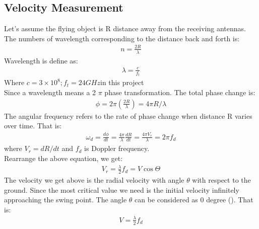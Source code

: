 \subsection{Velocity Measurement}
Let’s assume the flying object is R distance away from the receiving antennas. The numbers of wavelength corresponding to the distance back and forth is:
\begin{align}
n=\frac{2 R}{\lambda}    
\end{align}
Wavelength is define as:
\begin{align}
\lambda=\frac{c}{f_{t}}
\end{align}
Where $c=3 \times 10^{8} ; f_{t}=24 G H z$in this project\\
Since a wavelength means a 2 $\pi$ phase transformation. The total phase change is:
\begin{align}
\phi=2 \pi\left(\frac{2 R}{\lambda}\right)=4 \pi R / \lambda
\end{align}
The angular frequency refers to the rate of phase change when distance R varies over time. That is:
\begin{align}
\omega_{d}=\frac{d \phi}{d t}=\frac{4 \pi}{\lambda} \frac{d R}{d t}=\frac{4 \pi V_{r}}{\lambda}=2 \pi f_{d}
\end{align}
where $V_{r}=d R / d t$ and $f_{d}$ is Doppler frequency.\\
Rearrange the above equation, we get:
\begin{align}
V_{r}=\frac{\lambda}{2} f_{d}=V \cos \Theta
\end{align}
The velocity we get above is the radial velocity with angle $\theta$ with respect to the ground. Since the most critical value we need is the initial velocity infinitely approaching the swing point. The angle $\theta$ can be considered as 0 degree (\cite{martin2012evaluation}). That is:
\begin{align}
V=\frac{\lambda}{2} f_{d}
\end{align}


